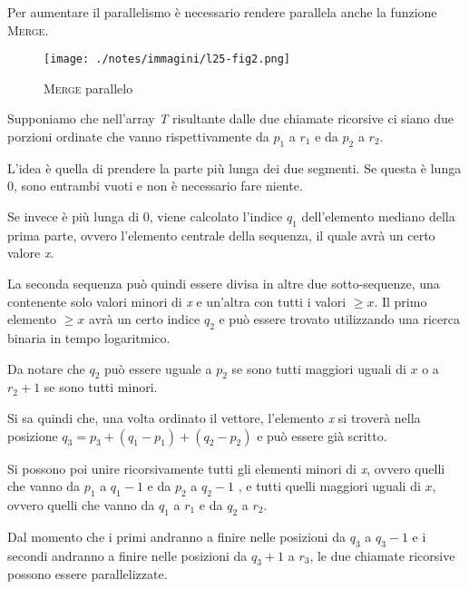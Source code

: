 Per aumentare il parallelismo è necessario rendere parallela anche la funzione \textsc{Merge}.

\begin{figure}[htbp]
\centering
\texttt{[image: ./notes/immagini/l25-fig2.png]}
\caption{\textsc{Merge} parallelo}
\end{figure}

Supponiamo che nell'array \emph{T} risultante dalle due chiamate ricorsive ci siano due porzioni ordinate che vanno rispettivamente da $p_1$ a $r_1$ e da $p_2$ a $r_2$.

L'idea è quella di prendere la parte più lunga dei due segmenti. 
Se questa è lunga 0, sono entrambi vuoti e non è necessario fare niente.

Se invece è più lunga di 0, viene calcolato l'indice $q_1$ dell'elemento mediano della prima parte,
ovvero l'elemento centrale della sequenza, il quale avrà un certo valore \emph{x}.

La seconda sequenza può quindi essere divisa in altre due sotto-sequenze, una contenente solo valori minori di \emph{x} e un'altra con tutti i valori $\geq x$. 
Il primo elemento $\geq x$ avrà un certo indice $q_2$ e può essere trovato utilizzando una ricerca binaria in tempo logaritmico.

Da notare che $q_2$ può essere uguale a $p_2$ se sono tutti maggiori uguali di $x$ o a $r_2+1$ se sono tutti minori.

Si sa quindi che, una volta ordinato il vettore, l'elemento \emph{x} si troverà nella posizione $q_3 = p_3 + (q_1-p_1) + (q_2-p_2)$ e può essere già scritto.

Si possono poi unire ricorsivamente tutti gli elementi minori di \emph{x}, ovvero quelli che vanno da $p_1$ a $q_1-1$ e da $p_2$ a $q_2-1$ , e tutti quelli maggiori uguali di $x$, ovvero quelli che vanno da $q_1$ a $r_1$ e da $q_2$ a $r_2$.

Dal momento che i primi andranno a finire nelle posizioni da $q_3$ a $q_3-1$ e i secondi andranno a finire nelle posizioni da $q_3+1$ a $r_3$, le due chiamate ricorsive possono essere parallelizzate.
